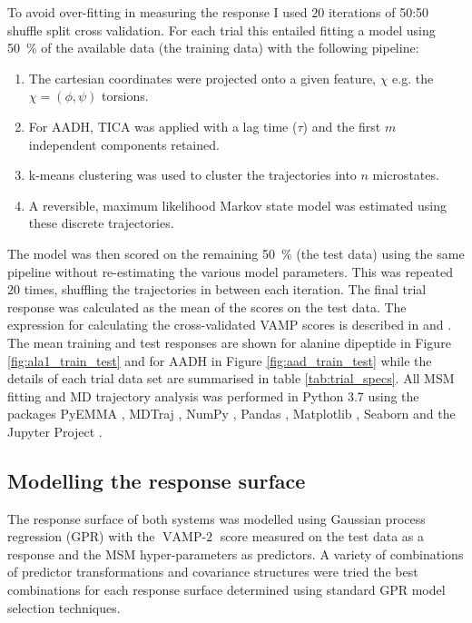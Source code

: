 To avoid over-fitting in measuring the response I used $20$ iterations of 50:50 shuffle split cross validation. For each trial this entailed fitting a model using \SI{50}{\percent} of the available data (the training data) with the following pipeline:

\begin{enumerate}
    \item \label{lst:modfititem1} The cartesian coordinates were projected onto a given feature, $\chi$ e.g. the $\chi = (\phi, \psi)$ torsions. 
    \item \label{lst:modfititem2} For AADH, TICA was applied with a lag time ($\tau$) and the first $m$ independent components retained. 
    \item \label{lst:modfititem3} k-means clustering was used to cluster the trajectories into $n$ microstates.
    \item \label{lst:modfititem4} A reversible, maximum likelihood Markov state model was estimated using these discrete trajectories. 
\end{enumerate}

The model was then scored on the remaining \SI{50}{\percent} (the test data) using the same pipeline without re-estimating the various model parameters. This was repeated $20$ times, shuffling the trajectories in between each iteration.  The final trial response was calculated as the mean of the scores on the test data. The expression for calculating the cross-validated VAMP scores is described in \cite{mcgibbonVariationalCrossvalidationSlow2015} and \cite{wuVariationalApproachLearning2019}.  The mean training and test responses are shown for alanine dipeptide in Figure \ref{fig:ala1_train_test} and for AADH in Figure \ref{fig:aad_train_test} while the details of each trial data set are summarised in table \ref{tab:trial_specs}. All MSM fitting and MD trajectory analysis was performed in Python 3.7 using the packages PyEMMA \cite{schererPyEMMASoftwarePackage2015a}, MDTraj \cite{mcgibbonMDTrajModernOpen2015}, NumPy \cite{waltNumPyArrayStructure2011}, Pandas \cite{mckinneyPandasFoundationalPython2011}, Matplotlib \cite{hunterMatplotlib2DGraphics2007},  Seaborn \cite{michaelwaskomMwaskomSeabornV02020} and the Jupyter Project \cite{kluyverJupyterNotebooksPublishing2016}. 

\subsection{Modelling the response surface}\label{sec:rsm}
The response surface of both systems was modelled using Gaussian process regression (GPR) with the $\operatorname{VAMP-2}$ score measured on the test data as a response and the MSM hyper-parameters as predictors. A variety of combinations of predictor transformations and covariance structures were tried the best combinations for each response surface determined using standard GPR model selection techniques. 

